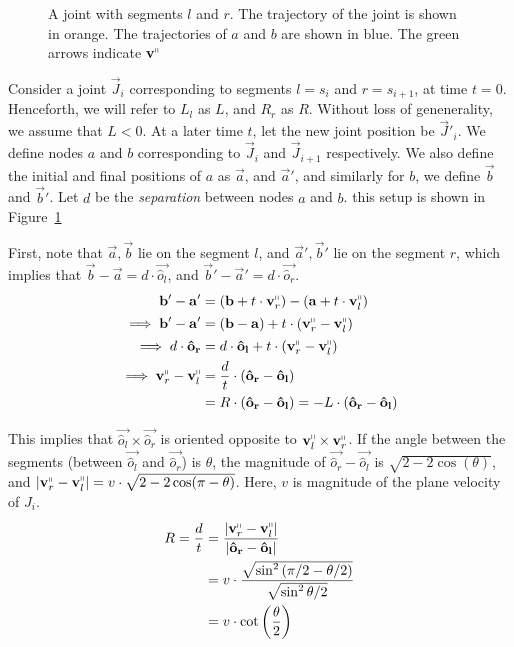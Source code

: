 \begin{figure}[htpb]
\graphicspath{{./notebooks/}}
    \centering
    \def\svgwidth{0.7\textwidth}
    
    \caption{A joint with segments $l$ and $r$.
    The trajectory of the joint is shown in orange.
    The trajectories of $a$ and $b$ are shown in blue.
    The green arrows indicate $\vec v^\shortparallel$}
    \label{fig:joint_plane_velocity}
\end{figure}

Consider a joint $\vec J_i$ corresponding to segments $l = s_i$ and $r = s_{i+1}$, at time $t=0$.
Henceforth, we will refer to $L_l$ as $L$, and $R_r$ as $R$.
Without loss of genenerality, we assume that $L<0$.
At a later time $t$, let the new joint position be $\vec J'_i$.
We define nodes $a$ and $b$ corresponding to $\vec J_i$ and $\vec J_{i+1}$ respectively.
We also define the initial and final positions of $a$ as $\vec a$,
and $\vec a'$, and similarly for $b$, we define $\vec b$ and $\vec b'$.
Let $d$ be the \emph{separation} between nodes $a$ and $b$.
this setup is shown in Figure~\ref{fig:joint_plane_velocity}

First, note that $\vec a, \vec b$ lie on the segment $l$, and $\vec a', \vec b'$ lie on the segment $r$,
which implies that $\vec b-\vec a = d\cdot \vec{\hat o_l}$, and $\vec b'-\vec a' = d\cdot \vec{\hat o_r}$.
\begin{align}
\vec b' - \vec a' &= (\vec b + t\cdot \vec v_r^\shortparallel) - (\vec a + t\cdot \vec v_l^\shortparallel)\\
\implies \vec b' - \vec a' &= (\vec b - \vec a) + t\cdot(\vec v_r^\shortparallel - \vec v_l^\shortparallel)\\
\implies d\cdot \vec{\hat o_r} &= d\cdot \vec{\hat o_l} + t\cdot(\vec v_r^\shortparallel - \vec v_l^\shortparallel)\\
\implies \vec v_r^\shortparallel - \vec v_l^\shortparallel &= \frac{d}{t}\cdot(\vec{\hat o_r}-\vec{\hat o_l})\\
&= R\cdot(\vec{\hat o_r}-\vec{\hat o_l}) = -L\cdot(\vec{\hat o_r}-\vec{\hat o_l})
\end{align}

This implies that $\vec{\hat o_l}\times \vec{\hat o_r}$ is oriented opposite to $\vec v_l^\shortparallel\times \vec v_r^\shortparallel$.
If the angle between the segments (between $\vec{\hat o_l}$ and $\vec{\hat o_r}$) is $\theta$,
the magnitude of $\vec{\hat o_r}-\vec{\hat o_l}$ is $\sqrt{2-2\cos(\theta)}$,
and $|\vec v_r^\shortparallel-\vec v_l^\shortparallel| = v\cdot\sqrt{2-2\cos(\pi-\theta)}$.
Here, $v$ is magnitude of the plane velocity of $J_i$.
\begin{align}
R = \frac dt &= \frac{|\vec v_r^\shortparallel - \vec v_l^\shortparallel|}{|\vec{\hat o_r}-\vec{\hat o_l}|}\\
&= v\cdot\frac{\sqrt{\sin^2\left( {\pi/2-\theta/2}\right)}}{\sqrt{\sin^2{\theta/2}}}\\
&= v\cdot\cot\left( \frac{\theta}{2} \right)
\end{align}


